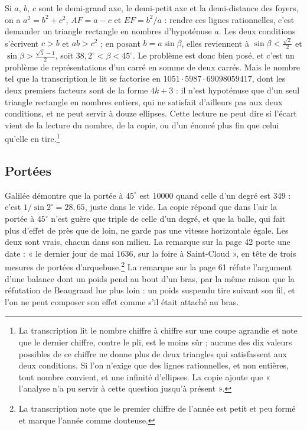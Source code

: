 \documentclass[11pt,a4paper]{article}
\begin{document}
Si $a$, $b$, $c$ sont le demi-grand axe, le demi-petit axe et la demi-distance
des foyers, on a $a^2 = b^2 + c^2$, $AF = a - c$ et $EF = b^2/a$ : rendre ces
lignes rationnelles, c'est demander un triangle rectangle en nombres
d'hypoténuse $a$. Les deux conditions s'écrivent $c > b$ et $ab > c^2$ ; en
posant $b = a\sin\beta$, elles reviennent à $\sin\beta < \frac{\sqrt2}{2}$ et
$\sin\beta > \frac{\sqrt5 - 1}{2}$, soit $38{,}2^\circ < \beta < 45^\circ$. Le
problème est donc bien posé, et c'est un problème de représentations d'un carré
en somme de deux carrés. Mais le nombre tel que la transcription le lit se
factorise en $1051 \cdot 5987 \cdot 69098059417$, dont les deux premiers
facteurs sont de la forme $4k+3$ : il n'est hypoténuse que d'un seul triangle
rectangle en nombres entiers, qui ne satisfait d'ailleurs pas aux deux
conditions, et ne peut servir à douze ellipses. Cette lecture
ne peut dire si l'écart vient de la lecture du nombre, de la copie, ou d'un
énoncé plus fin que celui qu'elle en tire.\footnote{La transcription lit le
nombre chiffre à chiffre sur une coupe agrandie et note que le dernier chiffre,
contre le pli, est le moins sûr ; aucune des dix valeurs possibles de ce chiffre
ne donne plus de deux triangles qui satisfassent aux deux conditions. Si l'on n'exige que
des lignes rationnelles, et non entières, tout nombre convient, et une
infinité d'ellipses. La copie ajoute que « l'analyse n'a pu servir à cette
question jusqu'à présent ».}

\subsection*{Portées}

Galilée démontre que la portée à $45^\circ$ est 10000 quand celle d'un degré est
349 : c'est $1/\sin 2^\circ = 28{,}65$, juste dans le vide. La copie répond que
dans l'air la portée à $45^\circ$ n'est guère que triple de celle d'un degré, et
que la balle, qui fait plus d'effet de près que de loin, ne garde pas une vitesse
horizontale égale. Les deux sont vrais, chacun dans son milieu. La remarque sur
la page 42 porte une date : « le dernier jour de mai 1636, sur la foire à
Saint-Cloud », en tête de trois mesures de portées d'arquebuse.\footnote{La
transcription note que le premier chiffre de l'année est petit et peu formé et
marque l'année comme douteuse.} La remarque sur la page 61 réfute l'argument
d'une balance dont un poids pend au bout d'un bras, par la même raison que la
réfutation de Beaugrand lue plus loin : un poids suspendu tire suivant son fil,
et l'on ne peut composer son effet comme s'il était attaché au bras.
\end{document}
